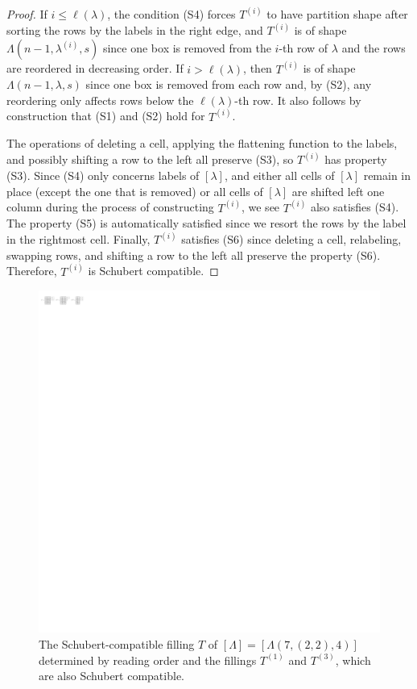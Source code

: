 \documentclass[11pt]{amsart}
\theoremstyle{definition}
\newcommand{\la}{\lambda}
\begin{document}
\begin{proof}
If $i\leq\ell(\la)$, the condition (S4) forces $T^{(i)}$ to have partition shape after sorting the rows by the labels in the right edge, and $T^{(i)}$ is of shape $\Lambda(n-1,\la^{(i)},s)$ since one box is removed from the $i$-th row of $\lambda$ and the rows are reordered in decreasing order.  If $i> \ell(\la)$, then $T^{(i)}$ is of shape $\Lambda(n-1,\la,s)$ since one box is removed from each row and, by (S2), any reordering only affects rows below the $\ell(\la)$-th row.  It also follows by construction that (S1) and (S2) hold for $T^{(i)}$.

The operations of deleting a cell, applying the flattening function to the labels, and possibly shifting a row to the left all preserve (S3), so $T^{(i)}$ has property (S3). Since (S4) only concerns labels of $[\lambda]$, and either all cells of $[\lambda]$ remain in place (except the one that is removed) or all cells of $[\la]$ are shifted left one column during the process of constructing $T^{(i)}$, we see $T^{(i)}$ also satisfies (S4). The property (S5) is automatically satisfied since we resort the rows by the label in the rightmost cell. Finally, $T^{(i)}$ satisfies (S6) since deleting a cell, relabeling, swapping rows, and shifting a row to the left all preserve the property (S6). Therefore, $T^{(i)}$ is Schubert compatible. 
\end{proof}




\begin{figure} 
    \centering
    \includegraphics[scale=0.45]{Figures/ReadingOrder.pdf}
    \caption{The Schubert-compatible filling $T$ of $[\Lambda] = [\Lambda(7,(2,2),4)]$ determined by reading order and the fillings $T^{(1)}$ and $T^{(3)}$, which are also Schubert compatible.}
    \label{fig:ReadingOrder}
\end{figure}
\end{document}
